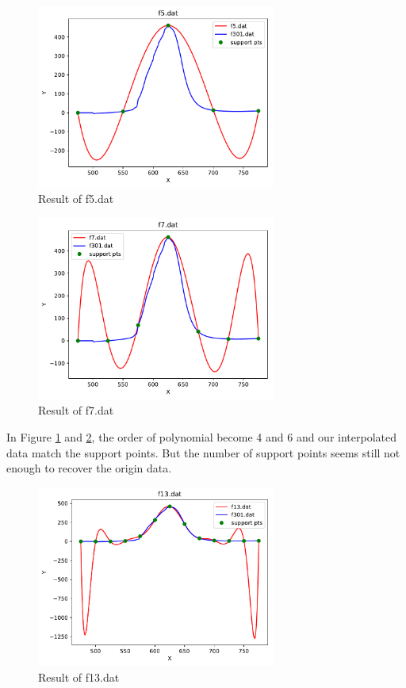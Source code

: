 \documentclass{article}
\begin{document}
\begin{figure}[H]
    \centering
    \includegraphics[width=0.7\textwidth]{src/f5.pdf}
    \caption{Result of f5.dat}
    \label{fig:f5}
\end{figure}
\begin{figure}[H]
    \centering
    \includegraphics[width=0.7\textwidth]{src/f7.pdf}
    \caption{Result of f7.dat}
    \label{fig:f7}
\end{figure}
In Figure \ref{fig:f5} and \ref{fig:f7}, the order of polynomial become 4 and 6 and our interpolated data match the support points.
But the number of support points seems still not enough to recover the origin data.
\begin{figure}[H]
    \centering
    \includegraphics[width=0.7\textwidth]{src/f13.pdf}
    \caption{Result of f13.dat}
    \label{fig:f13}
\end{figure}
\end{document}
